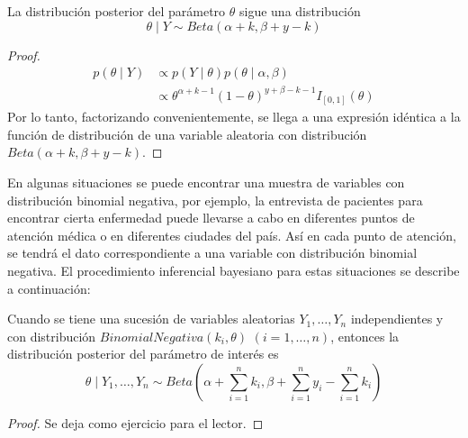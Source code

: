     \begin{Res}
    La distribuci\'on posterior del par\'ametro $\theta$ sigue una distribuci\'on
    \begin{equation*}
    \theta \mid Y \sim Beta(\alpha+k,\beta+y-k)
    \end{equation*}
    \end{Res}
    
    \begin{proof}
    \begin{align*}
    p(\theta \mid Y)&\propto p(Y \mid \theta)p(\theta \mid \alpha,\beta)\\
    &\propto \theta^{\alpha+k-1} (1-\theta)^{y+\beta-k-1}I_{[0,1]}(\theta)
    \end{align*}
    Por lo tanto, factorizando convenientemente, se llega a una expresi\'on id\'entica a la funci\'on de distribuci\'on de una variable aleatoria con distribuci\'on $Beta(\alpha+k,\beta+y-k)$.
    \end{proof}
    
    En algunas situaciones se puede encontrar una muestra de variables con distribuci\'on binomial negativa, por ejemplo, la entrevista de pacientes para encontrar cierta enfermedad puede llevarse a cabo en diferentes puntos de atenci\'on m\'edica o en diferentes ciudades del pa\'is. As\'i en cada punto de atenci\'on, se tendr\'a el dato correspondiente a una variable con distribuci\'on binomial negativa. El procedimiento inferencial bayesiano para estas situaciones se describe a continuaci\'on:
    
    \begin{Res}
    Cuando se tiene una sucesi\'on de variables aleatorias $Y_1,\ldots, Y_n$ independientes y con distribuci\'on $BinomialNegativa(k_i,\theta)$ $(i=1,\ldots,n)$, entonces la distribuci\'on posterior del par\'ametro de inter\'es es
    \begin{equation}
    \theta \mid Y_1,\ldots, Y_n \sim Beta(\alpha+\sum_{i=1}^n k_i,\beta+\sum_{i=1}^n y_i-\sum_{i=1}^n k_i)
    \end{equation}
    \end{Res}
    
    \begin{proof}
    Se deja como ejercicio para el lector.
    \end{proof}
    
